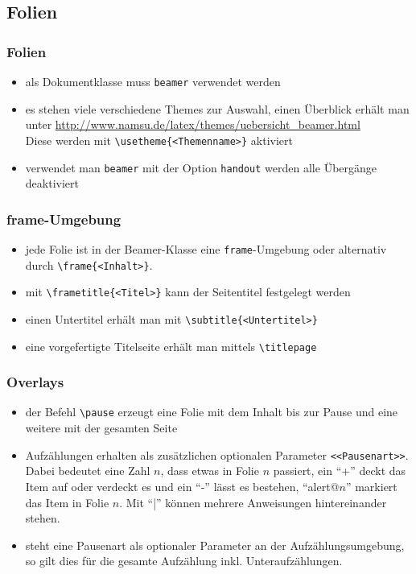\subsection{Folien}

\begin{frame}[fragile]
\frametitle{Folien}
\begin{itemize}[<+->]
  \item als Dokumentklasse muss \texttt{beamer} verwendet werden
  \item es stehen viele verschiedene Themes zur Auswahl, einen Überblick erhält man unter \url{http://www.namsu.de/latex/themes/uebersicht_beamer.html} \\
    Diese werden mit \lstinline[style=Latex]+\usetheme{<Themenname>}+ aktiviert
  \item verwendet man \texttt{beamer} mit der Option \texttt{handout} werden alle Übergänge deaktiviert

\end{itemize}
\end{frame}

\begin{frame}[fragile]
\frametitle{frame-Umgebung}
\begin{itemize}[<+->]
  \item jede Folie ist in der Beamer-Klasse eine \texttt{frame}-Umgebung oder alternativ durch \lstinline[style=Latex]+\frame{<Inhalt>}+.
  \item mit \lstinline[style=Latex]+\frametitle{<Titel>}+ kann der Seitentitel festgelegt werden
  \item einen Untertitel erhält man mit \lstinline[style=Latex]+\subtitle{<Untertitel>}+
  \item eine vorgefertigte Titelseite erhält man mittels \lstinline[style=Latex]+\titlepage+
\end{itemize}
\end{frame}

\begin{frame}[fragile]
\frametitle{Overlays}
\begin{itemize}[<+->]
  \item der Befehl \lstinline[style=Latex]+\pause+ erzeugt eine Folie mit dem Inhalt bis zur Pause und eine weitere mit der gesamten Seite
  \item Aufzählungen erhalten als zusätzlichen optionalen Parameter \lstinline[style=Latex]+<<Pausenart>>+.\\
    Dabei bedeutet eine Zahl $n$, dass etwas in Folie $n$ passiert, ein ``+'' deckt das Item auf oder verdeckt es und ein ``-'' lässt es bestehen, ``alert@$n$'' markiert das Item in Folie $n$. Mit ``|'' können mehrere Anweisungen hintereinander stehen.
  \item steht eine Pausenart als optionaler Parameter an der Aufzählungsumgebung, so gilt dies für die gesamte Aufzählung inkl. Unteraufzählungen.
\end{itemize}
\end{frame}


